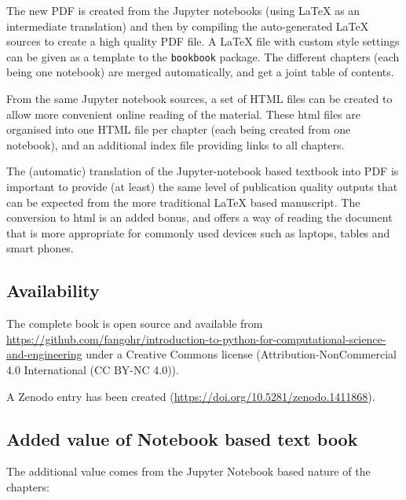 \documentclass{deliverablereport}
\begin{document}
The new PDF is created from the Jupyter notebooks (using LaTeX as an
intermediate translation) and then by compiling the auto-generated
LaTeX sources to create a high quality PDF file. A LaTeX file with
custom style settings can be given as a template to the
\texttt{bookbook} package. The different chapters (each being one
notebook) are merged automatically, and get a joint table of contents.

From the same Jupyter notebook sources, a set of HTML files can be
created to allow more convenient online reading of the material. These
html files are organised into one HTML file per chapter (each being
created from one notebook), and an additional index file providing
links to all chapters.

The (automatic) translation of the Jupyter-notebook based textbook
into PDF is important to provide (at least) the same level of
publication quality outputs that can be expected from the more
traditional LaTeX based manuscript. The conversion to html is an added
bonus, and offers a way of reading the document that is more
appropriate for commonly used devices such as laptops, tables and
smart phones.

\subsection{Availability}

The complete book is open source and available from\newline
{\tiny\url{https://github.com/fangohr/introduction-to-python-for-computational-science-and-engineering}}\linebreak
under a Creative Commons license (Attribution-NonCommercial 4.0
International (CC BY-NC 4.0)).

A Zenodo entry has been created (\url{https://doi.org/10.5281/zenodo.1411868}).



\subsection{Added value of Notebook based text book}

The additional value comes from the Jupyter Notebook based
nature of the chapters:
\end{document}
